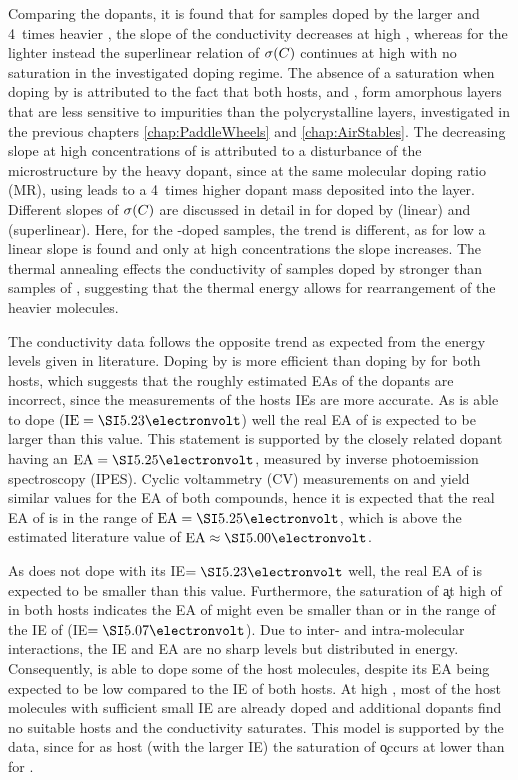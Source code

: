 Comparing the dopants, it is found that for samples doped by the larger and 4~times heavier \CSF, the slope of the conductivity decreases at high \C, whereas for the lighter \FS instead the superlinear relation of $\c(\C)$ continues at high \C with no saturation in the investigated doping regime.
The absence of a saturation when doping by \FS is attributed to the fact that both hosts, \meo and \lili, form amorphous layers that are less sensitive to impurities than the polycrystalline \CS layers, investigated in the previous chapters \ref{chap:PaddleWheels} and \ref{chap:AirStables}.
The decreasing slope at high concentrations of \CSF is attributed to a disturbance of the microstructure by the heavy dopant, since at the same molecular doping ratio (MR), using \CSF leads to a 4~times higher dopant mass deposited into the layer.
Different slopes of $\c(\C)$ are discussed in detail in  for \CS doped by \aob (linear) and \dmbi (superlinear). Here, for the \FS-doped samples, the trend is different, as for low \C a linear slope is found and only at high concentrations the slope increases.
The thermal annealing effects the conductivity of samples doped by \CSF stronger than samples of \FS, suggesting that the thermal energy allows for rearrangement of the heavier molecules.

The conductivity data follows the opposite trend as expected from the energy levels given in literature.
Doping by \FS is more efficient than doping by \CSF for both hosts, which suggests that the roughly estimated EAs of the dopants are incorrect, since the measurements of the hosts IEs are more accurate.
As \FS is able to dope \lili (\mbox{$\text{IE}=\eV{5.23}$}) well the real EA of \FS is expected to be larger than this value. This statement is supported by the closely related dopant \FV having an \mbox{$\text{EA}=\eV{5.25}$}\cite{Gao2001}, measured by inverse photoemission spectroscopy (IPES). Cyclic voltammetry (CV) measurements on \FV and \FS yield similar values for the EA of both compounds\cite{WellmannDiss}, hence it is expected that the real EA of \FS is in the range of \mbox{$\text{EA}=\eV{5.25}$}, which is above the estimated literature value of \mbox{$\text{EA}\approx\eV{5.00}$}\cite{Tietze2012}.

As \CSF does not dope \lili with its \mbox{IE$=\eV{5.23}$} well, the real EA of \CSF is expected to be smaller than this value.
Furthermore, the saturation of \c at high \C of \CSF in both hosts indicates the EA of \CSF might even be smaller than or in the range of the IE of \meo (\mbox{IE$=\eV{5.07}$}).
%
Due to inter- and intra-molecular interactions, the IE and EA are no sharp levels but distributed in energy. Consequently, \CSF is able to dope some of the host molecules, despite its EA being expected to be low compared to the IE of both hosts. At high \C, most of the host molecules with sufficient small IE are already doped and additional dopants find no suitable hosts and the conductivity saturates. This model is supported by the data, since for \lili as host (with the larger IE) the saturation of \c occurs at lower \C than for \meo.

